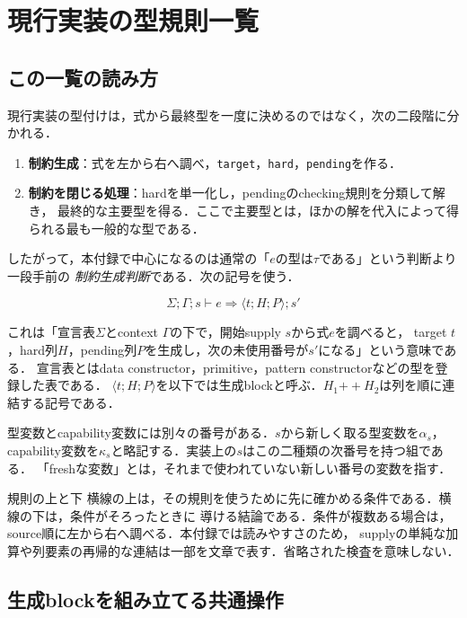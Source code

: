 \documentclass[11pt,a4paper,oneside]{ltjsbook}
\newcommand{\code}[1]{\texttt{#1}}
\begin{document}
\appendix

\chapter{現行実装の型規則一覧}

\section{この一覧の読み方}

現行実装の型付けは，式から最終型を一度に決めるのではなく，次の二段階に分かれる．

\begin{enumerate}[leftmargin=2em]
  \item \textbf{制約生成}：式を左から右へ調べ，\code{target}，\code{hard}，\code{pending}を作る．
  \item \textbf{制約を閉じる処理}：hardを単一化し，pendingのchecking規則を分類して解き，
        最終的な主要型を得る．ここで主要型とは，ほかの解を代入によって得られる最も一般的な型である．
\end{enumerate}

したがって，本付録で中心になるのは通常の「$e$の型は$\tau$である」という判断より一段手前の
\emph{制約生成判断}である．次の記号を使う．

\[
  \Sigma;\Gamma;s \vdash e \Longrightarrow
  \langle t;H;P\rangle;s'
\]

これは「宣言表$\Sigma$とcontext $\Gamma$の下で，開始supply $s$から式$e$を調べると，
target $t$，hard列$H$，pending列$P$を生成し，次の未使用番号が$s'$になる」という意味である．
宣言表とはdata constructor，primitive，pattern constructorなどの型を登録した表である．
$\langle t;H;P\rangle$を以下では生成blockと呼ぶ．$H_1\mathbin{+\!+}H_2$は列を順に連結する記号である．

型変数とcapability変数には別々の番号がある．$s$から新しく取る型変数を$\alpha_s$，
capability変数を$\kappa_s$と略記する．実装上の$s$はこの二種類の次番号を持つ組である．
「freshな変数」とは，それまで使われていない新しい番号の変数を指す．

\begin{pointbox}{規則の上と下}
横線の上は，その規則を使うために先に確かめる条件である．横線の下は，条件がそろったときに
導ける結論である．条件が複数ある場合は，source順に左から右へ調べる．本付録では読みやすさのため，
supplyの単純な加算や列要素の再帰的な連結は一部を文章で表す．省略された検査を意味しない．
\end{pointbox}

\section{生成blockを組み立てる共通操作}
\end{document}
